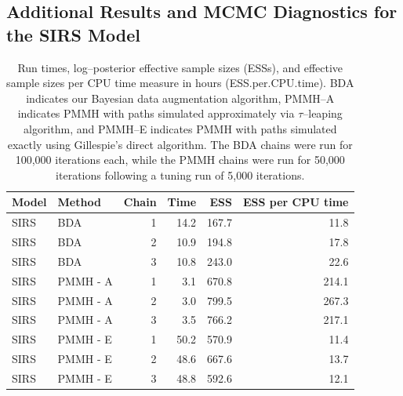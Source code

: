 \newpage
\subsection{Additional Results and MCMC Diagnostics for the SIRS Model}

\begin{table}[htbp]
	\centering
	\begin{tabular}{llrrrr}
		\hline
		Model & Method & Chain & Time & ESS & ESS per CPU time \\ 
		\hline
		SIRS & BDA &  1 & 14.2 & 167.7 & 11.8 \\ 
		SIRS & BDA &  2 & 10.9 & 194.8 & 17.8 \\ 
		SIRS & BDA &  3 & 10.8 & 243.0 & 22.6 \\ 
		SIRS & PMMH - A &  1 & 3.1 & 670.8 & 214.1 \\ 
		SIRS & PMMH - A &  2 & 3.0 & 799.5 & 267.3 \\ 
		SIRS & PMMH - A &  3 & 3.5 & 766.2 & 217.1 \\ 
		SIRS & PMMH - E &  1 & 50.2 & 570.9 & 11.4 \\ 
		SIRS & PMMH - E &  2 & 48.6 & 667.6 & 13.7 \\ 
		SIRS & PMMH - E &  3 & 48.8 & 592.6 & 12.1 \\ 
		\hline
	\end{tabular}
	\caption[Simulation 1 SIRS model run times and log--posterior effective sample sizes.]{Run times, log--posterior effective sample sizes (ESSs), and effective sample sizes per CPU time measure in hours (ESS.per.CPU.time). BDA indicates our Bayesian data augmentation algorithm, PMMH--A indicates PMMH with paths simulated approximately via $ \tau $--leaping algorithm, and PMMH--E indicates PMMH with paths simulated exactly using Gillespie's direct algorithm. The BDA chains were run for 100,000 iterations each, while the PMMH chains were run for 50,000 iterations following a tuning run of 5,000 iterations.}
	\label{tab:sim1_sirs_ess}
\end{table}

